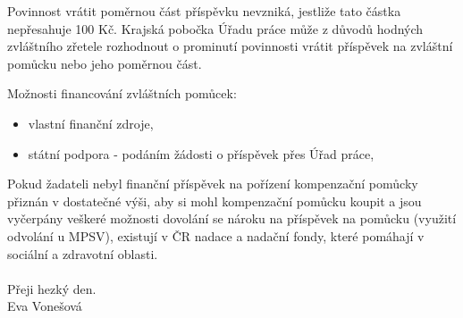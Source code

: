 \documentclass[thesis=M,czech]{FITthesis}[2012/06/26]
\begin{document}
Povinnost vrátit poměrnou část příspěvku nevzniká, jestliže tato částka
nepřesahuje 100 Kč. Krajská pobočka Úřadu práce může z důvodů hodných
zvláštního zřetele rozhodnout o prominutí povinnosti vrátit příspěvek na
zvláštní pomůcku nebo jeho poměrnou část.

Možnosti financování zvláštních pomůcek:
\begin{itemize}
\item vlastní finanční zdroje,
\item státní podpora - podáním žádosti o příspěvek přes Úřad práce,
\end{itemize}

Pokud žadateli nebyl finanční příspěvek na pořízení kompenzační pomůcky
přiznán v dostatečné výši, aby si mohl kompenzační pomůcku koupit a jsou
vyčerpány veškeré možnosti dovolání se nároku na příspěvek na pomůcku
(využití odvolání u MPSV), existují v ČR nadace a nadační fondy, které
pomáhají v sociální a zdravotní oblasti.
\\\\
Přeji hezký den.
\\
Eva Vonešová
\end{document}
